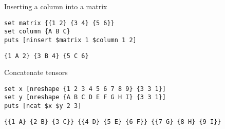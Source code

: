 \begin{example}{Inserting a column into a matrix}
\begin{lstlisting}
set matrix {{1 2} {3 4} {5 6}}
set column {A B C}
puts [ninsert $matrix 1 $column 1 2]
\end{lstlisting}
\tcblower
\begin{lstlisting}
{1 A 2} {3 B 4} {5 C 6}
\end{lstlisting}
\end{example}
\begin{example}{Concatenate tensors}
\begin{lstlisting}
set x [nreshape {1 2 3 4 5 6 7 8 9} {3 3 1}]
set y [nreshape {A B C D E F G H I} {3 3 1}]
puts [ncat $x $y 2 3]
\end{lstlisting}
\tcblower
\begin{lstlisting}
{{1 A} {2 B} {3 C}} {{4 D} {5 E} {6 F}} {{7 G} {8 H} {9 I}}
\end{lstlisting}
\end{example}

\clearpage
